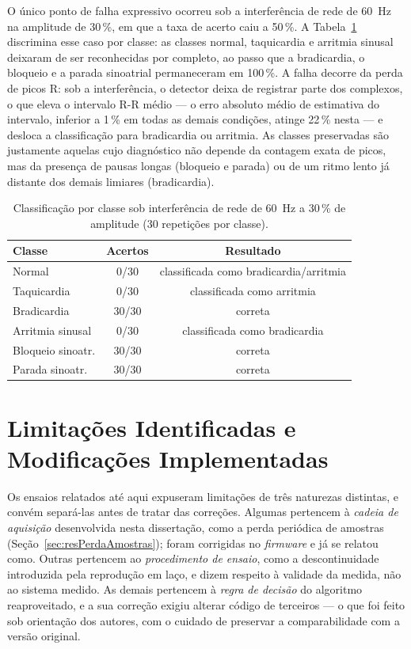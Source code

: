 O único ponto de falha expressivo ocorreu sob a interferência de rede de 60~Hz na amplitude de 30\,\%, em que a taxa de acerto caiu a 50\,\%. A Tabela~\ref{tab:rede30Classe} discrimina esse caso por classe: as classes normal, taquicardia e arritmia sinusal deixaram de ser reconhecidas por completo, ao passo que a bradicardia, o bloqueio e a parada sinoatrial permaneceram em 100\,\%. A falha decorre da perda de picos R: sob a interferência, o detector deixa de registrar parte dos complexos, o que eleva o intervalo R-R médio — o erro absoluto médio de estimativa do intervalo, inferior a 1\,\% em todas as demais condições, atinge 22\,\% nesta — e desloca a classificação para bradicardia ou arritmia. As classes preservadas são justamente aquelas cujo diagnóstico não depende da contagem exata de picos, mas da presença de pausas longas (bloqueio e parada) ou de um ritmo lento já distante dos demais limiares (bradicardia).

\begin{table}[htb]
\centering
\caption{Classificação por classe sob interferência de rede de 60~Hz a 30\,\% de amplitude (30 repetições por classe).}
\label{tab:rede30Classe}
\begin{tabular}{l c c}
\hline
\textbf{Classe} & \textbf{Acertos} & \textbf{Resultado} \\
\hline
Normal            & 0/30  & classificada como bradicardia/arritmia \\
Taquicardia       & 0/30  & classificada como arritmia \\
Bradicardia       & 30/30 & correta \\
Arritmia sinusal  & 0/30  & classificada como bradicardia \\
Bloqueio sinoatr. & 30/30 & correta \\
Parada sinoatr.   & 30/30 & correta \\
\hline
\end{tabular}
\end{table}

\section{Limitações Identificadas e Modificações Implementadas}
\label{sec:resModificacoes}

Os ensaios relatados até aqui expuseram limitações de três naturezas distintas, e convém
separá-las antes de tratar das correções. Algumas pertencem à \emph{cadeia de aquisição}
desenvolvida nesta dissertação, como a perda periódica de amostras
(Seção~\ref{sec:resPerdaAmostras}); foram corrigidas no \textit{firmware} e já se relatou
como. Outras pertencem ao \emph{procedimento de ensaio}, como a descontinuidade introduzida
pela reprodução em laço, e dizem respeito à validade da medida, não ao sistema medido. As
demais pertencem à \emph{regra de decisão} do algoritmo reaproveitado, e a sua correção
exigiu alterar código de terceiros --- o que foi feito sob orientação dos autores, com o
cuidado de preservar a comparabilidade com a versão original.

